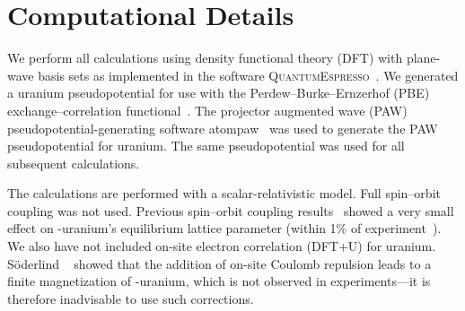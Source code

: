\section{Computational Details}\label{sec_comp}
We perform all calculations using density functional theory (DFT) with
plane-wave basis sets as implemented in the software
\textsc{QuantumEspresso}~\cite{giannozzi2009quantum}. We generated a uranium
pseudopotential for use with the Perdew--Burke--Ernzerhof (PBE)
exchange--correlation functional~\cite{Perdew1996b,Perdew1997}.
The projector augmented wave (PAW) pseudopotential-generating software
atompaw~\cite{holzwarth2001projector,tackett2001projector} was used to generate
the PAW pseudopotential for uranium. The same pseudopotential was used for all
subsequent calculations.

The calculations are performed with a scalar-relativistic
model. Full spin--orbit coupling was not used. Previous spin--orbit coupling
results~\cite{soderlind2002first} showed a very small effect on
\textalpha-uranium's equilibrium lattice parameter (within 1\% of
experiment~\cite{barrett1963crystal}). We also have not included on-site
electron correlation (DFT+U) for uranium. S\"oderlind
\etal~\cite{soderlind2014electron} showed that the addition of on-site Coulomb
repulsion leads to a finite magnetization of \textgamma-uranium, which is not
observed in experiments---it is therefore inadvisable to use such corrections.

